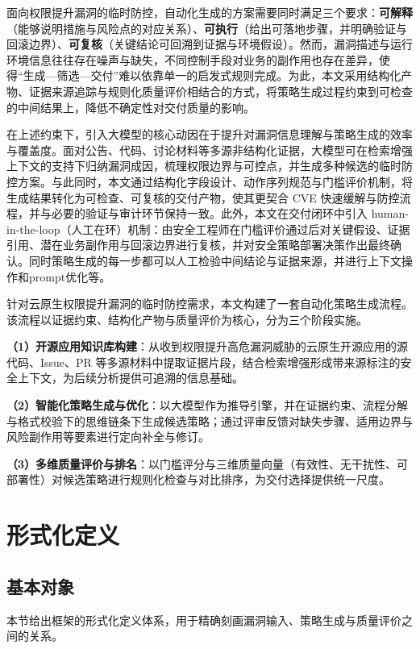 面向权限提升漏洞的临时防控，自动化生成的方案需要同时满足三个要求：\textbf{可解释}（能够说明措施与风险点的对应关系）、\textbf{可执行}（给出可落地步骤，并明确验证与回滚边界）、\textbf{可复核}（关键结论可回溯到证据与环境假设）。然而，漏洞描述与运行环境信息往往存在噪声与缺失，不同控制手段对业务的副作用也存在差异，使得“生成—筛选—交付”难以依靠单一的启发式规则完成。为此，本文采用结构化产物、证据来源追踪与规则化质量评价相结合的方式，将策略生成过程约束到可检查的中间结果上，降低不确定性对交付质量的影响。

在上述约束下，引入大模型的核心动因在于提升对漏洞信息理解与策略生成的效率与覆盖度。面对公告、代码、讨论材料等多源非结构化证据，大模型可在检索增强上下文的支持下归纳漏洞成因，梳理权限边界与可控点，并生成多种候选的临时防控方案。与此同时，本文通过结构化字段设计、动作序列规范与门槛评价机制，将生成结果转化为可检查、可复核的交付产物，使其更契合 CVE 快速缓解与防控流程，并与必要的验证与审计环节保持一致。此外，本文在交付闭环中引入 human-in-the-loop（人工在环）机制：由安全工程师在门槛评价通过后对关键假设、证据引用、潜在业务副作用与回滚边界进行复核，并对安全策略部署决策作出最终确认。同时策略生成的每一步都可以人工检验中间结论与证据来源，并进行上下文操作和prompt优化等。


针对云原生权限提升漏洞的临时防控需求，本文构建了一套自动化策略生成流程。该流程以证据约束、结构化产物与质量评价为核心，分为三个阶段实施。

{\bfseries （1）开源应用知识库构建}：从收到权限提升高危漏洞威胁的云原生开源应用的源代码、Issue、PR 等多源材料中提取证据片段，结合检索增强形成带来源标注的安全上下文，为后续分析提供可追溯的信息基础。

{\bfseries （2）智能化策略生成与优化}：以大模型作为推导引擎，并在证据约束、流程分解与格式校验下的思维链条下生成候选策略；通过评审反馈对缺失步骤、适用边界与风险副作用等要素进行定向补全与修订。

{\bfseries （3）多维质量评价与排名}：以门槛评分与三维质量向量（有效性、无干扰性、可部署性）对候选策略进行规则化检查与对比排序，为交付选择提供统一尺度。


\section{形式化定义}

\subsection{基本对象}

本节给出框架的形式化定义体系，用于精确刻画漏洞输入、策略生成与质量评价之间的关系。

